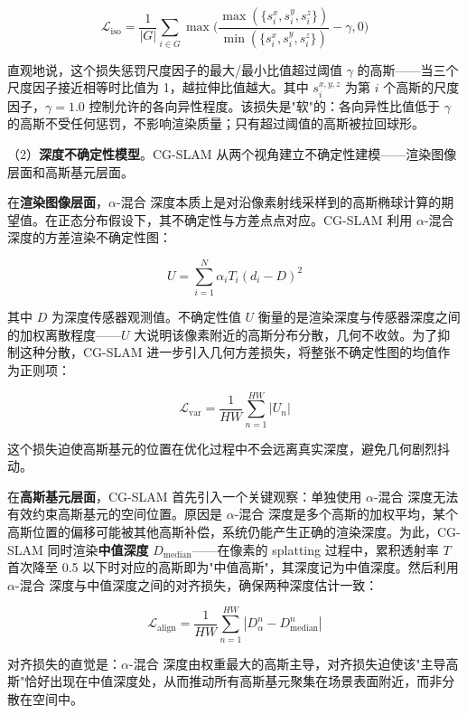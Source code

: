 \begin{equation}
    \mathcal{L}_\text{iso} = \frac{1}{|G|} \sum_{i \in G} \max\!\Big(\frac{\max(\{s_i^x, s_i^y, s_i^z\})}{\min(\{s_i^x, s_i^y, s_i^z\})} - \gamma, 0\Big)
\end{equation}

直观地说，这个损失惩罚尺度因子的最大/最小比值超过阈值 $\gamma$ 的高斯——当三个尺度因子接近相等时比值为 1，越拉伸比值越大。其中 $s_i^{x,y,z}$ 为第 $i$ 个高斯的尺度因子，$\gamma=1.0$ 控制允许的各向异性程度。该损失是"软"的：各向异性比值低于 $\gamma$ 的高斯不受任何惩罚，不影响渲染质量；只有超过阈值的高斯被拉回球形。

（2）\textbf{深度不确定性模型}。CG-SLAM 从两个视角建立不确定性建模——渲染图像层面和高斯基元层面。

在\textbf{渲染图像层面}，$\alpha$-混合 深度本质上是对沿像素射线采样到的高斯椭球计算的期望值。在正态分布假设下，其不确定性与方差点点对应。CG-SLAM 利用 $\alpha$-混合 深度的方差渲染不确定性图：

\begin{equation}
    U = \sum_{i=1}^{N} \alpha_i T_i (d_i - D)^2
\end{equation}

其中 $D$ 为深度传感器观测值。不确定性值 $U$ 衡量的是渲染深度与传感器深度之间的加权离散程度——$U$ 大说明该像素附近的高斯分布分散，几何不收敛。为了抑制这种分散，CG-SLAM 进一步引入几何方差损失，将整张不确定性图的均值作为正则项：

\begin{equation}
    \mathcal{L}_\text{var} = \frac{1}{HW} \sum_{n=1}^{HW} |U_n|
\end{equation}

这个损失迫使高斯基元的位置在优化过程中不会远离真实深度，避免几何剧烈抖动。

在\textbf{高斯基元层面}，CG-SLAM 首先引入一个关键观察：单独使用 $\alpha$-混合 深度无法有效约束高斯基元的空间位置。原因是 $\alpha$-混合 深度是多个高斯的加权平均，某个高斯位置的偏移可能被其他高斯补偿，系统仍能产生正确的渲染深度。为此，CG-SLAM 同时渲染\textbf{中值深度} $D_\text{median}$——在像素的 splatting 过程中，累积透射率 $T$ 首次降至 0.5 以下时对应的高斯即为"中值高斯"，其深度记为中值深度。然后利用 $\alpha$-混合 深度与中值深度之间的对齐损失，确保两种深度估计一致：

\begin{equation}
    \mathcal{L}_\text{align} = \frac{1}{HW} \sum_{n=1}^{HW} |D_\alpha^n - D_\text{median}^n|
\end{equation}

对齐损失的直觉是：$\alpha$-混合 深度由权重最大的高斯主导，对齐损失迫使该"主导高斯"恰好出现在中值深度处，从而推动所有高斯基元聚集在场景表面附近，而非分散在空间中。

